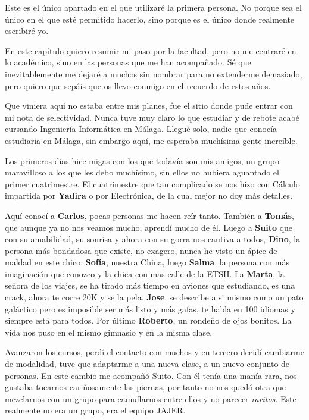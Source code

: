 \documentclass[12pt,a4paper,twoside,openright]{book}
\begin{document}
\begin{umaacknowledgments}
    Este es el único apartado en el que utilizaré la primera persona. No porque sea el único en el que esté permitido hacerlo, sino porque es el único donde realmente escribiré yo. 

    En este capítulo quiero resumir mi paso por la facultad, pero no me centraré en lo académico, sino en las personas que me han acompañado. Sé que inevitablemente me dejaré a muchos sin nombrar para no extenderme demasiado, pero quiero que sepáis que os llevo conmigo en el recuerdo de estos años.

    Que viniera aquí no estaba entre mis planes, fue el sitio donde pude entrar con mi nota de selectividad. Nunca tuve muy claro lo que estudiar y de rebote acabé cursando Ingeniería Informática en Málaga. 
    Llegué solo, nadie que conocía estudiaría en Málaga, sin embargo aquí, me esperaba muchísima gente increíble. 

    Los primeros días hice migas con los que todavía son mis amigos, un grupo maravilloso a los que les debo muchísimo, sin ellos no hubiera aguantado el primer cuatrimestre. El cuatrimestre que tan complicado se nos hizo con Cálculo impartida por \textbf{Yadira} o por Electrónica, de la cual mejor no doy más detalles.
    
    Aquí conocí a \textbf{Carlos}, pocas personas me hacen reír tanto. También a \textbf{Tomás}, que aunque ya no nos veamos mucho, aprendí mucho de él. Luego a \textbf{Suito} que con su amabilidad, su sonrisa y ahora con su gorra nos cautiva a todos, \textbf{Dino}, la persona más bondadosa que existe, no exagero, nunca he visto un ápice de maldad en este chico. \textbf{Sofía}, nuestra China, luego \textbf{Salma}, la persona con más imaginación que conozco y la chica con mas calle de la ETSII. La \textbf{Marta}, la señora de los viajes, se ha tirado más tiempo en aviones que estudiando, es una crack, ahora te corre 20K y se la pela. \textbf{Jose}, se describe a si mismo como un pato galáctico pero es imposible ser más listo y más gafas, te habla en 100 idiomas y siempre está para todos. Por último \textbf{Roberto}, un rondeño de ojos bonitos. La vida nos puso en el mismo gimnasio y en la misma clase.

    Avanzaron los cursos, perdí el contacto con muchos y en tercero decidí cambiarme de modalidad, tuve que adaptarme a una nueva clase, a un nuevo conjunto de personas. En este cambio me acompañó Suito. Con él tenía una manía rara, nos gustaba tocarnos cariñosamente las piernas, por tanto no nos quedó otra que mezclarnos con un grupo para camuflarnos entre ellos y no parecer \textit{raritos}. Este realmente no era un grupo, era el equipo JAJER.


\end{umaacknowledgments}
\end{document}
